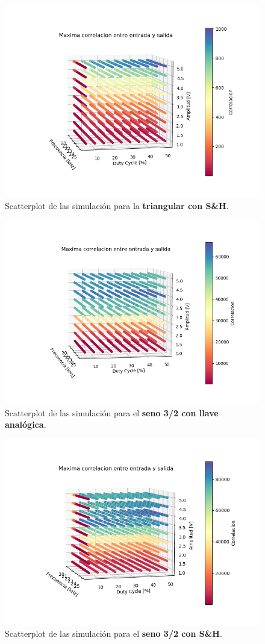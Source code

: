 \begin{figure}[H]
\centering
	\includegraphics[width=0.8\linewidth]{ImagenesEjercicio6/scatter_sh_triang.png}
	\caption{Scatterplot de las simulación para la \textbf{triangular con S\&H}.}
	\label{triang_sh}
\end{figure}

\begin{figure}[H]
\centering
	\includegraphics[width=0.8\linewidth]{ImagenesEjercicio6/scatter_llave_sen32.png}
	\caption{Scatterplot de las simulación para el \textbf{seno 3/2 con llave analógica}.}
	\label{sen32_llave}
\end{figure}

\begin{figure}[H]
\centering
	\includegraphics[width=0.8\linewidth]{ImagenesEjercicio6/scatter_sh_sen32.png}
	\caption{Scatterplot de las simulación para el \textbf{seno 3/2 con S\&H}.}
	\label{sen32_sh}
\end{figure}

